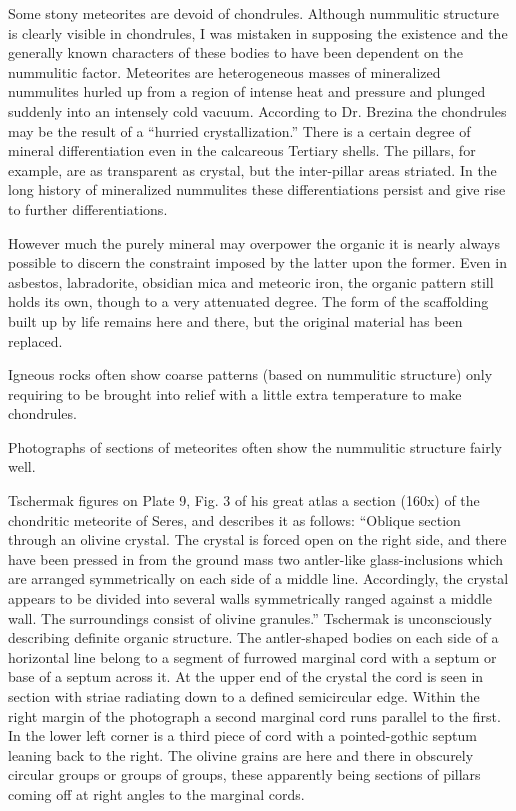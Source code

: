 \documentclass[a4paper, 12pt, oneside]{article}
\begin{document}
Some stony meteorites are devoid of chondrules. Although nummulitic structure is clearly visible in chondrules, I was mistaken in supposing the existence and the generally known characters of these bodies to have been dependent on the nummulitic factor. Meteorites are heterogeneous masses of mineralized nummulites hurled up from a region of intense heat and pressure and plunged suddenly into an intensely cold vacuum. According to Dr. Brezina the chondrules may be the result of a ``hurried crystallization.'' There is a certain degree of mineral differentiation even in the calcareous Tertiary shells. The pillars, for example, are as transparent as crystal, but the inter-pillar areas striated. In the long history of mineralized nummulites these differentiations persist and give rise to further differentiations.

However much the purely mineral may overpower the organic it is nearly always possible to discern the constraint imposed by the latter upon the former. Even in asbestos, labradorite, obsidian mica and meteoric iron, the organic pattern still holds its own, though to a very attenuated degree. The form of the scaffolding built up by life remains here and there, but the original material has been replaced.

Igneous rocks often show coarse patterns (based on nummulitic structure) only requiring to be brought into relief with a little extra temperature to make chondrules.

Photographs of sections of meteorites often show the nummulitic structure fairly well.

Tschermak figures on Plate 9, Fig. 3 of his great atlas a section (160x) of the chondritic meteorite of Seres, and describes it as follows: ``Oblique section through an olivine crystal. The crystal is forced open on the right side, and there have been pressed in from the ground mass two antler-like glass-inclusions which are arranged symmetrically on each side of a middle line. Accordingly, the crystal appears to be divided into several walls symmetrically ranged against a middle wall. The surroundings consist of olivine granules.'' Tschermak is unconsciously describing definite organic structure. The antler-shaped bodies on each side of a horizontal line belong to a segment of furrowed marginal cord with a septum or base of a septum across it. At the upper end of the crystal the cord is seen in section with striae radiating down to a defined semicircular edge. Within the right margin of the photograph a second marginal cord runs parallel to the first. In the lower left corner is a third piece of cord with a pointed-gothic septum leaning back to the right. The olivine grains are here and there in obscurely circular groups or groups of groups, these apparently being sections of pillars coming off at right angles to the marginal cords.
\end{document}
